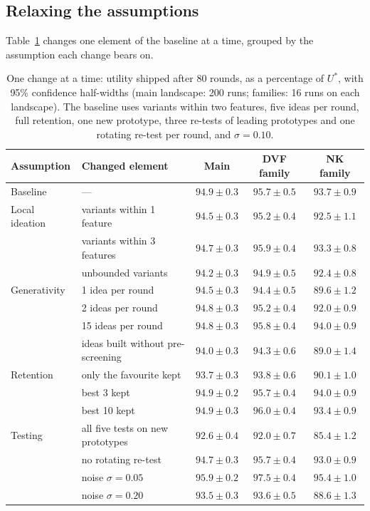 \documentclass[10pt,twocolumn]{article}
\theoremstyle{definition}
\begin{document}
\subsection{Relaxing the assumptions}
\label{sec:ablation}

Table~\ref{tab:ablation} changes one element of the baseline at a time, grouped by the assumption each change bears on.

\begin{table}[t]
\caption{One change at a time: utility shipped after 80 rounds, as a percentage of $U^*$, with 95\% confidence half-widths (main landscape: 200 runs; families: 16 runs on each landscape). The baseline uses variants within two features, five ideas per round, full retention, one new prototype, three re-tests of leading prototypes and one rotating re-test per round, and $\sigma=0.10$.}
\label{tab:ablation}
\centering\small
\begin{tabular}{@{}llccc@{}}
\toprule
Assumption & Changed element & Main & DVF family & NK family\\
\midrule
Baseline & --- & $94.9\pm0.3$ & $95.7\pm0.5$ & $93.7\pm0.9$\\
\addlinespace[2pt]
Local ideation & variants within 1 feature & $94.5\pm0.3$ & $95.2\pm0.4$ & $92.5\pm1.1$\\
 & variants within 3 features & $94.7\pm0.3$ & $95.9\pm0.4$ & $93.3\pm0.8$\\
 & unbounded variants & $94.2\pm0.3$ & $94.9\pm0.5$ & $92.4\pm0.8$\\
\addlinespace[2pt]
Generativity & 1 idea per round & $94.5\pm0.3$ & $94.4\pm0.5$ & $89.6\pm1.2$\\
 & 2 ideas per round & $94.8\pm0.3$ & $95.2\pm0.4$ & $92.0\pm0.9$\\
 & 15 ideas per round & $94.8\pm0.3$ & $95.8\pm0.4$ & $94.0\pm0.9$\\
 & ideas built without pre-screening & $94.0\pm0.3$ & $94.3\pm0.6$ & $89.0\pm1.4$\\
\addlinespace[2pt]
Retention & only the favourite kept & $93.7\pm0.3$ & $93.8\pm0.6$ & $90.1\pm1.0$\\
 & best 3 kept & $94.9\pm0.2$ & $95.7\pm0.4$ & $94.0\pm0.9$\\
 & best 10 kept & $94.9\pm0.3$ & $96.0\pm0.4$ & $93.4\pm0.9$\\
\addlinespace[2pt]
Testing & all five tests on new prototypes & $92.6\pm0.4$ & $92.0\pm0.7$ & $85.4\pm1.2$\\
 & no rotating re-test & $94.7\pm0.3$ & $95.7\pm0.4$ & $93.0\pm0.9$\\
 & noise $\sigma=0.05$ & $95.9\pm0.2$ & $97.5\pm0.4$ & $95.4\pm1.0$\\
 & noise $\sigma=0.20$ & $93.5\pm0.3$ & $93.6\pm0.5$ & $88.6\pm1.3$\\
\bottomrule
\end{tabular}
\end{table}
\end{document}
